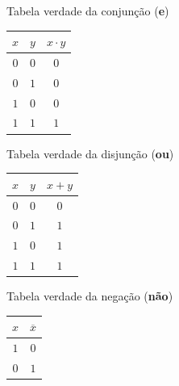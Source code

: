 \documentclass{beamer}
\begin{document}
\begin{frame}
\hspace{4ex}
%
\begin{minipage}{16ex}
\centering
Tabela verdade da conjunção (\textbf{e})\\[6pt]
\begin{tabular}{cc|c}
 $x$ & $y$ & $x \cdot y$ \\
\hline
 $0$ & $0$ & $0$ \\
 $0$ & $1$ & $0$ \\
 $1$ & $0$ & $0$ \\
 $1$ & $1$ & $1$
\end{tabular}
\end{minipage}
%
\hspace{3ex}
%
\begin{minipage}{18ex}
\centering
Tabela verdade da disjunção  (\textbf{ou})\\[6pt]
\begin{tabular}{cc|c}
 $x$ & $y$ & $x + y$ \\
\hline
 $0$ & $0$ & $0$ \\
 $0$ & $1$ & $1$ \\
 $1$ & $0$ & $1$ \\
 $1$ & $1$ & $1$
\end{tabular}
\end{minipage}
%
\hspace{3ex}
%
\begin{minipage}{18ex}
\centering
Tabela verdade da negação  (\textbf{não})\\[12pt]
\begin{tabular}{c|c}
 $x$ & $\overline{x}$ \\
\hline
 $1$ & $0$ \\
 $0$ & $1$
\end{tabular}
\end{minipage}

\end{frame}

\end{document}
